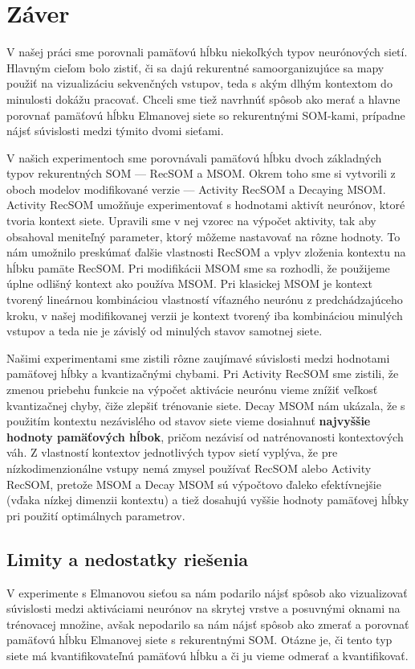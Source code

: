 \chapter*{Záver}
V našej práci sme porovnali pamäťovú hĺbku niekoľkých typov neurónových sietí.
Hlavným cieľom bolo zistiť, či sa dajú rekurentné samoorganizujúce sa mapy použiť na vizualizáciu
sekvenčných vstupov, teda s akým dlhým kontextom do minulosti dokážu pracovať. Chceli sme tiež navrhnúť 
spôsob ako merať a hlavne porovnať pamäťovú hĺbku Elmanovej siete so rekurentnými SOM-kami, prípadne 
nájsť súvislosti medzi týmito dvomi sieťami.

V našich experimentoch sme porovnávali pamäťovú hĺbku dvoch základných typov rekurentných 
SOM --- RecSOM a MSOM. Okrem toho sme si vytvorili z oboch modelov modifikované verzie --- Activity RecSOM a Decaying MSOM.
Activity RecSOM umožňuje experimentovať s hodnotami aktivít neurónov, ktoré tvoria kontext siete. Upravili sme v nej
vzorec na výpočet aktivity, tak aby obsahoval meniteľný parameter, ktorý môžeme nastavovať na rôzne hodnoty.
To nám umožnilo preskúmať ďalšie vlastnosti RecSOM a vplyv zloženia kontextu na hĺbku pamäte RecSOM.
Pri modifikácii MSOM sme sa rozhodli, že použijeme úplne odlišný kontext ako používa MSOM. Pri klasickej MSOM
je kontext tvorený lineárnou kombináciou vlastností víťazného neurónu z predchádzajúceho kroku, v našej modifikovanej 
verzii je kontext tvorený iba kombináciou minulých vstupov a teda nie je závislý od minulých stavov samotnej siete.

Našimi experimentami sme zistili rôzne zaujímavé súvislosti medzi hodnotami pamäťovej hĺbky a kvantizačnými chybami.
Pri Activity RecSOM sme zistili, že zmenou priebehu funkcie na výpočet aktivácie neurónu vieme znížiť 
veľkosť kvantizačnej chyby, čiže zlepšiť trénovanie siete.
Decay MSOM nám ukázala, že s použitím kontextu nezávislého od stavov siete vieme dosiahnuť \textbf{najvyššie hodnoty pamäťových hĺbok}, pričom nezávisí od
natrénovanosti kontextových váh.
Z vlastností kontextov jednotlivých typov sietí vyplýva, že pre nízkodimenzionálne vstupy nemá zmysel používať RecSOM alebo Activity RecSOM, pretože 
MSOM a Decay MSOM sú výpočtovo ďaleko efektívnejšie (vďaka nízkej dimenzii kontextu) a tiež dosahujú vyššie hodnoty pamäťovej hĺbky pri použití optimálnych parametrov.


\section{Limity a nedostatky riešenia}
V experimente s Elmanovou sieťou sa nám podarilo nájsť spôsob ako vizualizovať súvislosti medzi 
aktiváciami neurónov na skrytej vrstve a posuvnými oknami na trénovacej množine, avšak 
nepodarilo sa nám nájsť spôsob ako zmerať a porovnať pamäťovú hĺbku Elmanovej siete s rekurentnými SOM.
Otázne je, či tento typ siete má kvantifikovateľnú pamäťovú hĺbku a či ju vieme odmerať a kvantifikovať.

